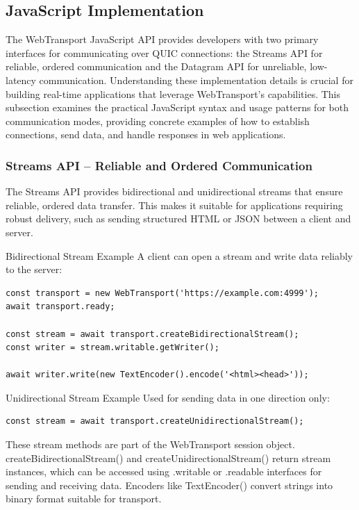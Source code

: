 \subsection{JavaScript Implementation}

The WebTransport JavaScript API provides developers with two primary interfaces for communicating over QUIC connections: the Streams API for reliable, ordered communication and the Datagram API for unreliable, low-latency communication. Understanding these implementation details is crucial for building real-time applications that leverage WebTransport's capabilities. This subsection examines the practical JavaScript syntax and usage patterns for both communication modes, providing concrete examples of how to establish connections, send data, and handle responses in web applications.

\subsubsection{Streams API – Reliable and Ordered Communication}

The Streams API provides bidirectional and unidirectional streams that ensure reliable, ordered data transfer. This makes it suitable for applications requiring robust delivery, such as sending structured HTML or JSON between a client and server.

Bidirectional Stream Example  
A client can open a stream and write data reliably to the server:

\begin{lstlisting}[breaklines=true,basicstyle=\small\ttfamily,frame=single]
const transport = new WebTransport('https://example.com:4999'); 
await transport.ready; 

const stream = await transport.createBidirectionalStream(); 
const writer = stream.writable.getWriter(); 

await writer.write(new TextEncoder().encode('<html><head>')); 
\end{lstlisting}

Unidirectional Stream Example  
Used for sending data in one direction only:

\begin{lstlisting}[breaklines=true,basicstyle=\small\ttfamily,frame=single]
const stream = await transport.createUnidirectionalStream();
\end{lstlisting}

These stream methods are part of the WebTransport session object. createBidirectionalStream() and createUnidirectionalStream() return stream instances, which can be accessed using .writable or .readable interfaces for sending and receiving data. Encoders like TextEncoder() convert strings into binary format suitable for transport.

